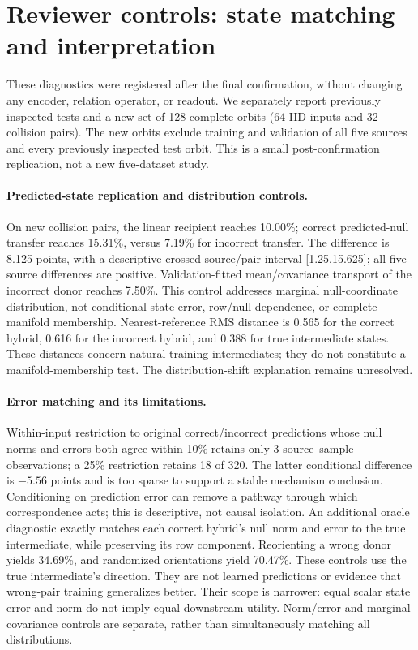 \section{Reviewer controls: state matching and interpretation}
These diagnostics were registered after the final confirmation, without changing any encoder, relation operator, or readout. We separately report previously inspected tests and a new set of 128 complete orbits (64 IID inputs and 32 collision pairs). The new orbits exclude training and validation of all five sources and every previously inspected test orbit. This is a small post-confirmation replication, not a new five-dataset study.

\paragraph{Predicted-state replication and distribution controls.}
On new collision pairs, the linear recipient reaches 10.00\%; correct predicted-null transfer reaches 15.31\%, versus 7.19\% for incorrect transfer. The difference is 8.125 points, with a descriptive crossed source/pair interval [1.25,15.625]; all five source differences are positive.
Validation-fitted mean/covariance transport of the incorrect donor reaches 7.50\%. This control addresses marginal null-coordinate distribution, not conditional state error, row/null dependence, or complete manifold membership.
Nearest-reference RMS distance is 0.565 for the correct hybrid, 0.616 for the incorrect hybrid, and 0.388 for true intermediate states. These distances concern natural training intermediates; they do not constitute a manifold-membership test. The distribution-shift explanation remains unresolved.

\paragraph{Error matching and its limitations.}
Within-input restriction to original correct/incorrect predictions whose null norms and errors both agree within 10\% retains only 3 source--sample observations; a 25\% restriction retains 18 of 320. The latter conditional difference is $-5.56$ points and is too sparse to support a stable mechanism conclusion. Conditioning on prediction error can remove a pathway through which correspondence acts; this is descriptive, not causal isolation.
An additional oracle diagnostic exactly matches each correct hybrid's null norm and error to the true intermediate, while preserving its row component. Reorienting a wrong donor yields 34.69\%, and randomized orientations yield 70.47\%. These controls use the true intermediate's direction. They are not learned predictions or evidence that wrong-pair training generalizes better. Their scope is narrower: equal scalar state error and norm do not imply equal downstream utility. Norm/error and marginal covariance controls are separate, rather than simultaneously matching all distributions.

